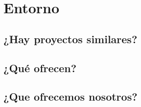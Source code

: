 
\section{Entorno}
	\subsection{¿Hay proyectos similares?}
	\subsection{¿Qué ofrecen?} %
	\subsection{¿Que ofrecemos nosotros?} %
	